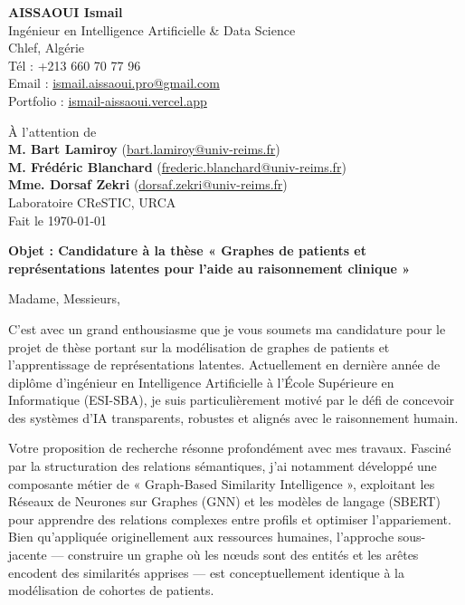 \documentclass[a4paper,11pt]{article}
\begin{document}
\begin{flushleft}
    \textbf{AISSAOUI Ismail} \\
    Ingénieur en Intelligence Artificielle \& Data Science \\
    Chlef, Algérie \\
    Tél : +213 660 70 77 96 \\
    Email : \href{mailto:ismail.aissaoui.pro@gmail.com}{ismail.aissaoui.pro@gmail.com} \\
    Portfolio : \href{https://ismail-aissaoui.vercel.app}{ismail-aissaoui.vercel.app}
\end{flushleft}

\begin{flushright}
    À l'attention de \\
    \textbf{M. Bart Lamiroy} (\href{mailto:bart.lamiroy@univ-reims.fr}{bart.lamiroy@univ-reims.fr}) \\
    \textbf{M. Frédéric Blanchard} (\href{mailto:frederic.blanchard@univ-reims.fr}{frederic.blanchard@univ-reims.fr}) \\
    \textbf{Mme. Dorsaf Zekri} (\href{mailto:dorsaf.zekri@univ-reims.fr}{dorsaf.zekri@univ-reims.fr}) \\
    Laboratoire CReSTIC, URCA \\
    Fait le \today
\end{flushright}

\vspace{0.5cm}

\noindent \textbf{Objet : Candidature à la thèse « Graphes de patients et représentations latentes pour l'aide au raisonnement clinique »}

\vspace{0.5cm}

Madame, Messieurs,

\medskip

C'est avec un grand enthousiasme que je vous soumets ma candidature pour le projet de thèse portant sur la modélisation de graphes de patients et l'apprentissage de représentations latentes. Actuellement en dernière année de diplôme d'ingénieur en Intelligence Artificielle à l'École Supérieure en Informatique (ESI-SBA), je suis particulièrement motivé par le défi de concevoir des systèmes d'IA transparents, robustes et alignés avec le raisonnement humain.

Votre proposition de recherche résonne profondément avec mes travaux. Fasciné par la structuration des relations sémantiques, j'ai notamment développé une composante métier de « Graph-Based Similarity Intelligence », exploitant les Réseaux de Neurones sur Graphes (GNN) et les modèles de langage (SBERT) pour apprendre des relations complexes entre profils et optimiser l'appariement. Bien qu'appliquée originellement aux ressources humaines, l'approche sous-jacente — construire un graphe où les nœuds sont des entités et les arêtes encodent des similarités apprises — est conceptuellement identique à la modélisation de cohortes de patients.
\end{document}
